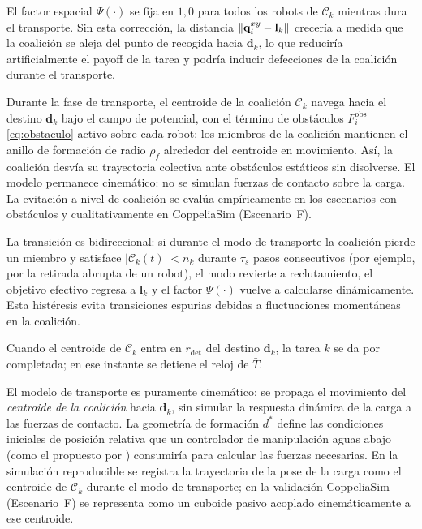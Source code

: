 El factor espacial $\Psi(\cdot)$ se fija en $1{,}0$ para todos los robots de
$\mathcal{C}_k$ mientras dura el transporte. Sin esta corrección, la
distancia $\left\|\mathbf{q}_i^{xy} - \mathbf{l}_k\right\|$ crecería a medida que la
coalición se aleja del punto de recogida hacia $\mathbf{d}_k$, lo que reduciría
artificialmente el payoff de la tarea y podría inducir defecciones de la
coalición durante el transporte.

Durante la fase de transporte, el centroide de la coalición $\mathcal{C}_k$ navega
hacia el destino $\mathbf{d}_k$ bajo el campo de potencial, con el término de
obstáculos $F_i^{\mathrm{obs}}$ \eqref{eq:obstaculo} activo sobre cada robot; los
miembros de la coalición mantienen el anillo de formación de radio $\rho_f$ alrededor
del centroide en movimiento. Así, la coalición desvía su trayectoria
colectiva ante obstáculos estáticos sin disolverse. El modelo permanece
cinemático: no se simulan fuerzas de contacto sobre la carga. La evitación a nivel de
coalición se evalúa empíricamente en los escenarios con obstáculos y cualitativamente en
CoppeliaSim (Escenario~F).

La transición es bidireccional: si durante el modo de transporte la coalición
pierde un miembro y satisface $|\mathcal{C}_k(t)| < n_k$ durante $\tau_s$ pasos
consecutivos (por ejemplo, por la retirada abrupta de un robot), el modo revierte
a reclutamiento, el objetivo efectivo regresa a $\mathbf{l}_k$ y el factor
$\Psi(\cdot)$ vuelve a calcularse dinámicamente. Esta histéresis evita
transiciones espurias debidas a fluctuaciones momentáneas en la coalición.

Cuando el centroide de $\mathcal{C}_k$ entra en $r_{\mathrm{det}}$ del destino
$\mathbf{d}_k$, la tarea $k$ se da por completada; en ese instante se detiene el reloj
de $\bar{T}$.

\begin{observacion}
El modelo de transporte es puramente cinemático: se propaga el movimiento
del \emph{centroide de la coalición} hacia $\mathbf{d}_k$, sin simular la
respuesta dinámica de la carga a las fuerzas de contacto. La geometría de
formación $d^*$ define las condiciones iniciales de posición relativa
que un controlador de manipulación aguas abajo (como el propuesto por
\citealt{ebel2024cooperative}) consumiría para calcular las fuerzas necesarias.
En la simulación reproducible se registra la trayectoria de la pose de la carga como
el centroide de $\mathcal{C}_k$ durante el modo de transporte; en la validación
CoppeliaSim (Escenario~F) se representa como un cuboide pasivo acoplado
cinemáticamente a ese centroide.
\end{observacion}

